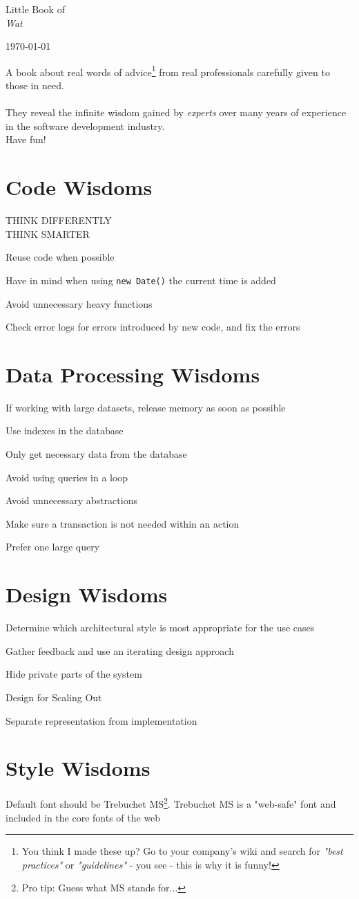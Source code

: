 \documentclass[12pt,twoside,a5paper]{book}
\newcommand{\bigtext}[2]{\begingroup\scalefont{#1} #2\par\endgroup}
\newcommand{\meme}[1]{\vspace*{\fill}\begin{center}{\bigtext{5}{#1}}\end{center}\vspace*{\fill}\pagebreak}
\newcommand{\longmeme}[1]{\vspace*{\fill}\begin{center}{\bigtext{4}{#1}}\end{center}\vspace*{\fill}\pagebreak}
\newcommand{\verylongmeme}[1]{\vspace*{\fill}\begin{center}{\bigtext{3}{#1}}\end{center}\vspace*{\fill}\pagebreak}
\newcommand{\topic}[2]{\chapter{#1}\bigtext{3}{#2}\vspace*{\fill}\pagebreak}
\begin{document}
\begin{titlepage}
\begin{center}

\vspace*{3cm}

{\LARGE Little Book of}\\
\bigtext{10}{\textit{Wat}}
 
\vfill

{\today}

\end{center}
\end{titlepage}

\vspace*{\fill}
{\noindent \large A book about real words of advice\footnote{You think I made these up? Go to your company's wiki and search for \textit{"best practices"} or \textit{"guidelines"} - you see - this is why it is funny!} from real professionals carefully given to those in need. 
\\
\\
They reveal the infinite wisdom gained by \textit{experts} over many years of experience in the software development industry.\\[2cm]}
{\LARGE Have fun!}
\vspace*{\fill}
\pagebreak

\topic{Code Wisdoms}{THINK DIFFERENTLY\\THINK SMARTER}

\meme{Reuse code when possible}

\longmeme{Have in mind when using \texttt{new Date()} the current time is added}

\meme{Avoid unnecessary heavy functions}

\longmeme{Check error logs for errors introduced by new code, and fix the errors}

\topic{Data Processing Wisdoms}{}

\longmeme{If working with large datasets, release memory as soon as possible}

\meme{Use indexes in the database}

\meme{Only get necessary data from the database}

\meme{Avoid using queries in a loop}

\meme{Avoid unnecessary abstractions}

\longmeme{Make sure a transaction is not needed within an action}

\meme{Prefer one large query}

\topic{Design Wisdoms}{}
\longmeme{Determine which architectural style is most appropriate for the use cases}

\longmeme{Gather feedback and use an iterating design approach}

\meme{Hide private parts of the system}

\meme{Design for Scaling Out}

\longmeme{Separate representation from implementation}

\topic{Style Wisdoms}{}
\verylongmeme{Default font should be Trebuchet MS\footnote{Pro tip: Guess what MS stands for...}. Trebuchet MS is a "web-safe" font and included in the core fonts of the web}
\end{document}

